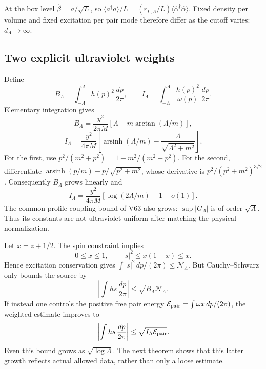 \documentclass[11pt]{article}
\theoremstyle{remark}
\begin{document}
At the box level \(\widehat\beta=a/\sqrt L\), so
\(\langle a^\dagger a\rangle/L
=(r_{L,\Lambda}/L)\langle\widehat\alpha^\dagger
\widehat\alpha\rangle\).  Fixed density per volume and
fixed excitation per pair mode therefore differ as the
cutoff varies: \(d_\Lambda\to\infty\).

\subsection{Two explicit ultraviolet weights}

Define
\[
 B_\Lambda=\int_{-\Lambda}^{\Lambda}h(p)^2\,\frac{dp}{2\pi},
 \qquad
 I_\Lambda=\int_{-\Lambda}^{\Lambda}
                       \frac{h(p)^2}{\omega(p)}\,\frac{dp}{2\pi}.
\]
Elementary integration gives
\[
 B_\Lambda=\frac{y^2}{2\pi M}
                 [\Lambda-m\arctan(\Lambda/m)],
\]
\[
 I_\Lambda=\frac{y^2}{4\pi M}
 \left[\operatorname{arsinh}(\Lambda/m)
                 -\frac{\Lambda}{\sqrt{\Lambda^2+m^2}}\right].
\]
For the first, use \(p^2/(m^2+p^2)=1-m^2/(m^2+p^2)\).
For the second, differentiate
\(\operatorname{arsinh}(p/m)-p/\sqrt{p^2+m^2}\),
whose derivative is \(p^2/(p^2+m^2)^{3/2}\).
Consequently \(B_\Lambda\) grows linearly and
\[
 I_\Lambda=\frac{y^2}{4\pi M}
             [\log(2\Lambda/m)-1+o(1)] .
\]
The common-profile coupling bound of V63 also grows:
\(\sup|G_\Lambda|\) is of order \(\sqrt\Lambda\).
Thus its constants are not ultraviolet-uniform after
matching the physical normalization.

Let \(x=z+1/2\).  The spin constraint implies
\[
 0\leq x\leq1,\qquad |s|^2\leq x(1-x)\leq x.
\]
Hence excitation conservation gives
\(\int|s|^2\,dp/(2\pi)\leq\mathcal N_\Lambda\).
But Cauchy--Schwarz only bounds the source by
\[
 \left|\int h s\,\frac{dp}{2\pi}\right|
       \leq\sqrt{B_\Lambda\mathcal N_\Lambda}.
\]
If instead one controls the positive free pair energy
\(\mathcal E_{\rm pair}=\int\omega x\,dp/(2\pi)\), the
weighted estimate improves to
\[
 \left|\int h s\,\frac{dp}{2\pi}\right|
       \leq\sqrt{I_\Lambda\mathcal E_{\rm pair}}.
\]
Even this bound grows as \(\sqrt{\log\Lambda}\).
The next theorem shows that this latter growth reflects
actual allowed data, rather than only a loose estimate.
\end{document}
